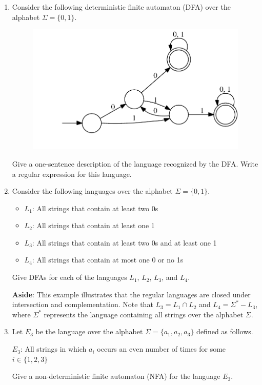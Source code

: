 \documentclass[11pt]{article}
\begin{document}
\begin{enumerate}

\item
Consider the following deterministic finite automaton (DFA) over the
alphabet $\Sigma = \{0, 1\}$.
\begin{figure}[htb]
\begin{center}
\includegraphics[scale=0.7]{consec-two.pdf}
\end{center}
\end{figure}

Give a one-sentence description of the language recognized by the DFA.
Write a regular expression for this language.

\item
Consider the following languages over the alphabet
$\Sigma = \{0, 1\}$.
\begin{itemize}
\item $L_1$: All strings that contain at least two 0s
\item $L_2$: All strings that contain at least one 1
\item $L_3$:
All strings that contain at least two 0s and at least one 1
\item $L_4$: All strings that contain at most one 0 or no 1s
\end{itemize}
Give DFAs for each of the languages $L_1$, $L_2$, $L_3$, and $L_4$.

{\bf Aside}: This example illustrates that the regular languages are
closed under intersection and complementation. Note that
$L_3 = L_1 \cap L_2$ and $L_4 = \Sigma^{*} - L_3$, where $\Sigma^{*}$
represents the language containing all strings over the alphabet
$\Sigma$.

\item
Let $E_{3}$ be the language over the alphabet
$\Sigma = \{a_{1}, a_{2}, a_{3}\}$ defined as follows.
\begin{center}
$E_{3}$: All strings in which $a_{i}$ occurs an even number of times
for some $i \in \{1, 2, 3\}$
\end{center}
Give a non-deterministic finite automaton (NFA) for the language
$E_{3}$.


\end{enumerate}
\end{document}
